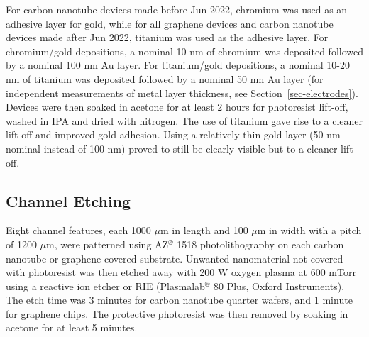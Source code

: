 \documentclass[
  a4paper,
]{scrbook}
\begin{document}
For carbon nanotube devices made before Jun 2022, chromium was used as
an adhesive layer for gold, while for all graphene devices and carbon
nanotube devices made after Jun 2022, titanium was used as the adhesive
layer. For chromium/gold depositions, a nominal 10 nm of chromium was
deposited followed by a nominal 100 nm Au layer. For titanium/gold
depositions, a nominal 10-20 nm of titanium was deposited followed by a
nominal 50 nm Au layer (for independent measurements of metal layer
thickness, see Section~\ref{sec-electrodes}). Devices were then soaked
in acetone for at least 2 hours for photoresist lift-off, washed in IPA
and dried with nitrogen. The use of titanium gave rise to a cleaner
lift-off and improved gold adhesion. Using a relatively thin gold layer
(50 nm nominal instead of 100 nm) proved to still be clearly visible but
to a cleaner lift-off.

\hypertarget{channel-etching}{%
\subsection{Channel Etching}\label{channel-etching}}

Eight channel features, each 1000 \(\mu\)m in length and 100 \(\mu\)m in
width with a pitch of 1200 \(\mu\)m, were patterned using
AZ\(^\circledR\) 1518 photolithography on each carbon nanotube or
graphene-covered substrate. Unwanted nanomaterial not covered with
photoresist was then etched away with 200 W oxygen plasma at 600 mTorr
using a reactive ion etcher or RIE (Plasmalab\(^\circledR\) 80 Plus,
Oxford Instruments). The etch time was 3 minutes for carbon nanotube
quarter wafers, and 1 minute for graphene chips. The protective
photoresist was then removed by soaking in acetone for at least 5
minutes.
\end{document}
